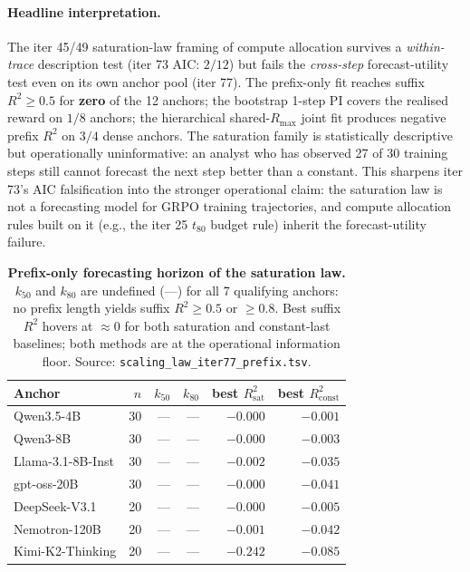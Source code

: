 \paragraph{Headline interpretation.}
The iter 45/49 saturation-law framing of compute allocation survives a
\emph{within-trace} description test (iter 73 AIC: $2/12$) but fails the
\emph{cross-step} forecast-utility test even on its own anchor pool
(iter 77).  The prefix-only fit reaches suffix $R^2 \geq 0.5$ for
\textbf{zero} of the 12 anchors; the bootstrap 1-step PI covers the
realised reward on $1/8$ anchors; the hierarchical shared-$R_\mathrm{max}$
joint fit produces negative prefix $R^2$ on $3/4$ dense anchors.  The
saturation family is statistically descriptive but operationally
uninformative: an analyst who has observed 27 of 30 training steps
still cannot forecast the next step better than a constant.  This
sharpens iter 73's AIC falsification into the stronger operational
claim: the saturation law is not a forecasting model for GRPO training
trajectories, and compute allocation rules built on it
(e.g., the iter 25 $t_{80}$ budget rule) inherit the
forecast-utility failure.

\begin{table}[t]
  \centering
  \small
  \begin{tabular}{lrrrrr}
    \toprule
    Anchor & $n$ & $k_{50}$ & $k_{80}$ & best $R^2_\mathrm{sat}$ & best $R^2_\mathrm{const}$ \\
    \midrule
      Qwen3.5-4B            & 30 & --- & --- & $-0.000$ & $-0.001$ \\
      Qwen3-8B              & 30 & --- & --- & $-0.000$ & $-0.003$ \\
      Llama-3.1-8B-Inst     & 30 & --- & --- & $-0.002$ & $-0.035$ \\
      gpt-oss-20B           & 30 & --- & --- & $-0.000$ & $-0.041$ \\
      DeepSeek-V3.1         & 20 & --- & --- & $-0.000$ & $-0.005$ \\
      Nemotron-120B         & 20 & --- & --- & $-0.001$ & $-0.042$ \\
      Kimi-K2-Thinking      & 20 & --- & --- & $\mathbf{-0.242}$ & $\mathbf{-0.085}$ \\
    \bottomrule
  \end{tabular}
  \caption{\textbf{Prefix-only forecasting horizon of the saturation law.}
    $k_{50}$ and $k_{80}$ are undefined (---) for all 7 qualifying anchors:
    no prefix length yields suffix $R^2 \geq 0.5$ or $\geq 0.8$.  Best
    suffix $R^2$ hovers at $\approx 0$ for both saturation and constant-last
    baselines; both methods are at the operational information floor.
    Source: \texttt{scaling\_law\_iter77\_prefix.tsv}.}
  \label{tab:iter77-prefix}
\end{table}

